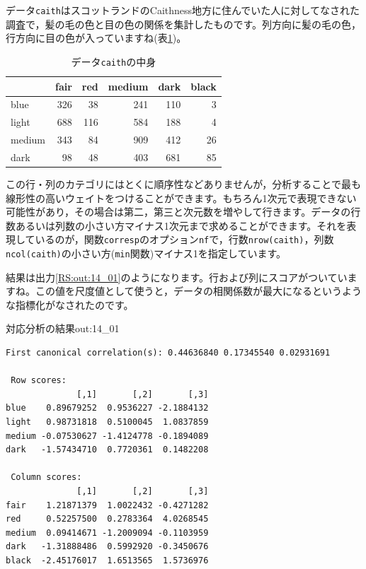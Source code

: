 \documentclass{ltjsbook}
\begin{document}
データ\texttt{caith}はスコットランドのCaithness地方に住んでいた人に対してなされた調査で，髪の毛の色と目の色の関係を集計したものです。列方向に髪の毛の色，行方向に目の色が入っていますね(表\ref{tbl:14_06})。

\begin{table}[ht]
	\caption{データ\texttt{caith}の中身}
	\centering
	\begin{tabular}{lrrrrr}
		\hline
		       & fair & red & medium & dark & black \\\hline
		\hline
		blue   & 326  & 38  & 241    & 110  & 3     \\
		light  & 688  & 116 & 584    & 188  & 4     \\
		medium & 343  & 84  & 909    & 412  & 26    \\
		dark   & 98   & 48  & 403    & 681  & 85    \\
		\hline
	\end{tabular}
	\label{tbl:14_06}
\end{table}

この行・列のカテゴリにはとくに順序性などありませんが，分析することで最も線形性の高いウェイトをつけることができます。もちろん1次元で表現できない可能性があり，その場合は第二，第三と次元数を増やして行きます。データの行数あるいは列数の小さい方マイナス1次元まで求めることができます。それを表現しているのが，関数\texttt{corresp}のオプション\texttt{nf}で，行数\texttt{nrow(caith)}，列数\texttt{ncol(caith)}の小さい方(\texttt{min}関数)マイナス1を指定しています。

結果は出力\ref{RS:out:14_01}のようになります。行および列にスコアがついていますね。この値を尺度値として使うと，データの相関係数が最大になるというような指標化がなされたのです。
\begin{Rscreen}{対応分析の結果}{out:14_01}
	\begin{verbatim}
First canonical correlation(s): 0.44636840 0.17345540 0.02931691 

 Row scores:
              [,1]       [,2]       [,3]
blue    0.89679252  0.9536227 -2.1884132
light   0.98731818  0.5100045  1.0837859
medium -0.07530627 -1.4124778 -0.1894089
dark   -1.57434710  0.7720361  0.1482208

 Column scores:
              [,1]       [,2]       [,3]
fair    1.21871379  1.0022432 -0.4271282
red     0.52257500  0.2783364  4.0268545
medium  0.09414671 -1.2009094 -0.1103959
dark   -1.31888486  0.5992920 -0.3450676
black  -2.45176017  1.6513565  1.5736976
\end{verbatim}
\end{Rscreen}
\end{document}

